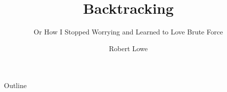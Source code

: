 \documentclass{beamer}
\title{Backtracking}
\subtitle{\small Or How I Stopped Worrying and Learned to Love Brute Force}
\author{Robert Lowe\\}
\institute[Maryville College] %
{
  Division of Mathematics and Computer Science\\
  Maryville College
}
\date[]{}
\begin{document}
\begin{frame}
  \titlepage
\end{frame}

\begin{frame}{Outline}
  \tableofcontents
\end{frame}




\end{document}

